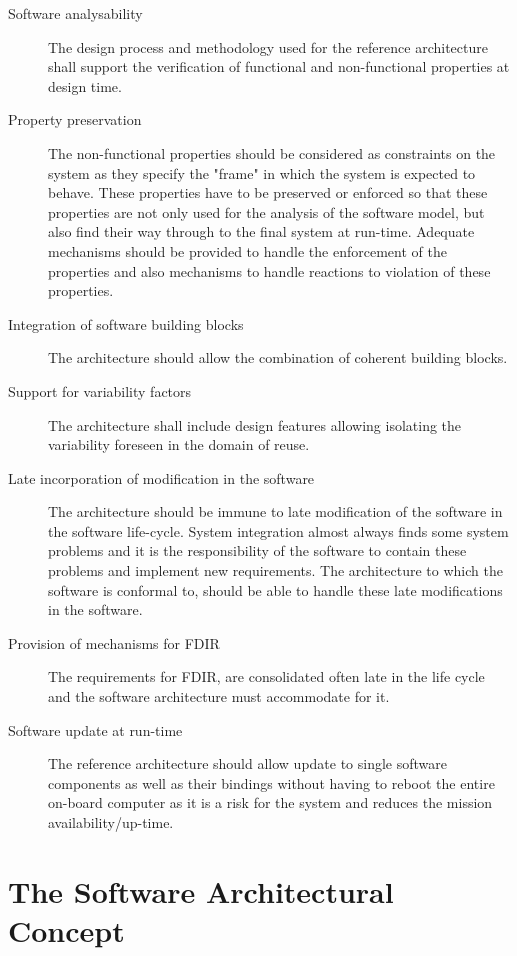 \begin{description}
\item [Software analysability] The design process and methodology used for the reference architecture shall support the verification of functional and non-functional properties at design time.

\item [Property preservation] The non-functional properties should be considered as constraints on the system as they specify the "frame" in which the system is expected to behave. 
These properties have to be preserved or enforced so that these properties are not only used for the analysis of the software model, but also find their way through to the final system at run-time. Adequate mechanisms should be provided to handle the enforcement of the properties and also mechanisms to handle reactions to violation of these properties. 

\item [Integration of software building blocks] The architecture should allow the combination of coherent building blocks.

\item [Support for variability factors] The architecture shall include design features allowing isolating the variability foreseen in the domain of reuse.

\item [Late incorporation of modification in the software] The architecture should be immune to late modification of the software in the software life-cycle. System integration almost always finds some system problems and it is the responsibility of the software to contain these problems and implement new requirements. The architecture to which the software is conformal to, should be able to handle these late modifications in the software.

\item [Provision of mechanisms for FDIR] The requirements for FDIR, are consolidated often late in the life cycle and the software architecture must accommodate for it.

\item [Software update at run-time] The reference architecture should allow update to single software components as well as their bindings without having to reboot the entire on-board computer as it is a risk for the system and reduces the mission availability/up-time.
\end{description}  

\section{The Software Architectural Concept}
